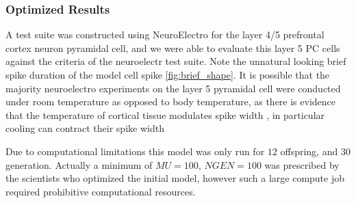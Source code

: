\subsubsection{Optimized Results}
\begin{table}[ht]
\centering
{}
\end{table}

A test suite was constructed using NeuroElectro for the layer 4/5 prefrontal cortex neuron pyramidal cell, and we were able to evaluate this layer 5 PC cells against the criteria of the neuroelectr test suite. Note the unnatural looking brief spike duration of the model cell spike  \ref{fig:brief_shape}. It is possible that the majority neuroelectro experiments on the layer 5 pyramidal cell were conducted under room temperature as opposed to body temperature, as there is evidence that the temperature of cortical tissue modulates spike width \cite{goldin2017temperature}, in particular cooling can contract their spike width

%

Due to computational limitations this model was only run for 
$12$ offspring, and $30$ generation. Actually a minimum of $MU=100$, $NGEN =100$ was prescribed by the scientists who optimized the initial model, however such a large compute job required prohibitive computational resources.


